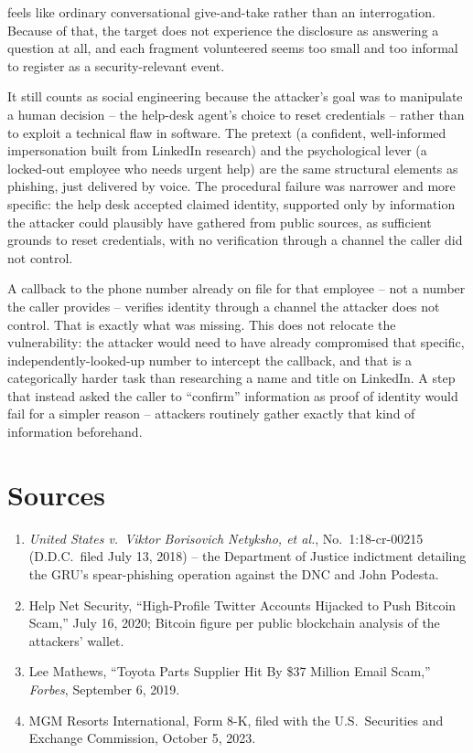 \begin{answerkey}
feels like ordinary conversational give-and-take rather than an interrogation. Because of that, the
target does not experience the disclosure as answering a question at all, and each fragment
volunteered seems too small and too informal to register as a security-relevant event.
\item It still counts as social engineering because the attacker's goal was to manipulate a human
decision -- the help-desk agent's choice to reset credentials -- rather than to exploit a technical
flaw in software. The pretext (a confident, well-informed impersonation built from LinkedIn
research) and the psychological lever (a locked-out employee who needs urgent help) are the same
structural elements as phishing, just delivered by voice. The procedural failure was narrower and
more specific: the help desk accepted claimed identity, supported only by information the attacker
could plausibly have gathered from public sources, as sufficient grounds to reset credentials, with
no verification through a channel the caller did not control.
\item A callback to the phone number already on file for that employee -- not a number the caller
provides -- verifies identity through a channel the attacker does not control. That is exactly
what was missing. This does not relocate the vulnerability: the attacker would need to have
already compromised that specific, independently-looked-up number to intercept the callback, and
that is a categorically harder task than researching a name and title on LinkedIn. A step that
instead asked the caller to ``confirm'' information as proof of identity would fail for a simpler
reason -- attackers routinely gather exactly that kind of information beforehand.
\end{answerkey}

\section*{Sources}
\begin{enumerate}[label=\lbrack\arabic*\rbrack, leftmargin=2.2em]
\item {}\emph{United States v.\ Viktor Borisovich Netyksho, et al.}, No.\ 1:18-cr-00215 (D.D.C.\ filed
July 13, 2018) -- the Department of Justice indictment detailing the GRU's spear-phishing operation
against the DNC and John Podesta.
\item {}Help Net Security, ``High-Profile Twitter Accounts Hijacked to Push Bitcoin Scam,'' July 16,
2020; Bitcoin figure per public blockchain analysis of the attackers' wallet.
\item {}Lee Mathews, ``Toyota Parts Supplier Hit By \$37 Million Email Scam,'' \emph{Forbes},
September 6, 2019.
\item {}MGM Resorts International, Form 8-K, filed with the U.S.\ Securities and Exchange Commission,
October 5, 2023.
\end{enumerate}
